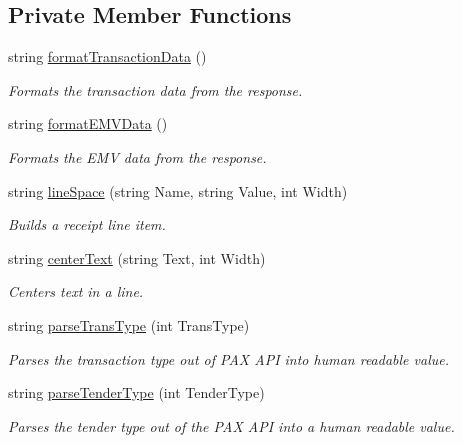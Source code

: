 \subsection*{Private Member Functions}
\begin{DoxyCompactItemize}
\item 
string \mbox{\hyperlink{class_cert_complete_1_1_p_a_x_device_af902321272f9e358d1db15fcf89b413f}{format\+Transaction\+Data}} ()
\begin{DoxyCompactList}\small\item\em Formats the transaction data from the response. \end{DoxyCompactList}\item 
string \mbox{\hyperlink{class_cert_complete_1_1_p_a_x_device_a3fa86d4dfd6fde3e513c90edf86a6b4e}{format\+E\+M\+V\+Data}} ()
\begin{DoxyCompactList}\small\item\em Formats the E\+MV data from the response. \end{DoxyCompactList}\item 
string \mbox{\hyperlink{class_cert_complete_1_1_p_a_x_device_a85cc4efeb960df15a9dde1685b6c6310}{line\+Space}} (string Name, string Value, int Width)
\begin{DoxyCompactList}\small\item\em Builds a receipt line item. \end{DoxyCompactList}\item 
string \mbox{\hyperlink{class_cert_complete_1_1_p_a_x_device_aa0eec7259f73a2109e7a0b9107d64cf6}{center\+Text}} (string Text, int Width)
\begin{DoxyCompactList}\small\item\em Centers text in a line. \end{DoxyCompactList}\item 
string \mbox{\hyperlink{class_cert_complete_1_1_p_a_x_device_a54cc04faf61b6e9a46363bb7a501124b}{parse\+Trans\+Type}} (int Trans\+Type)
\begin{DoxyCompactList}\small\item\em Parses the transaction type out of P\+AX A\+PI into human readable value. \end{DoxyCompactList}\item 
string \mbox{\hyperlink{class_cert_complete_1_1_p_a_x_device_a1cd769ca0a4f2aeadaf1995355b2f0a9}{parse\+Tender\+Type}} (int Tender\+Type)
\begin{DoxyCompactList}\small\item\em Parses the tender type out of the P\+AX A\+PI into a human readable value. \end{DoxyCompactList}\item 

\end{DoxyCompactItemize}
